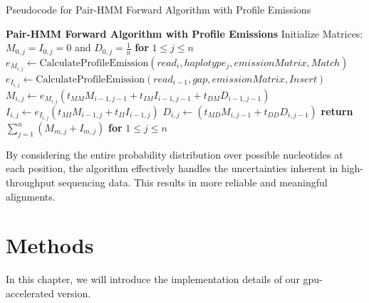 \documentclass[PhD]{PHlab-thesis}
\begin{document}
\vspace{0.5cm} %
\begin{algorithm}
\caption{Pseudocode for Pair-HMM Forward Algorithm with Profile Emissions}
\begin{algorithmic}[1]
\Procedure\textbf{Pair-HMM Forward Algorithm with Profile Emissions}
\State Initialize Matrices: $M_{0,j} = I_{0,j} = 0$ and $D_{0,j} = \frac{1}{n}$ \textbf{for} $1 \leq j \leq n$
        \State $e_{M_{i,j}} \gets \text{CalculateProfileEmission}(read_{i}, haplotype_{j}, emissionMatrix, Match)$
        \State $e_{I_{i,j}} \gets \text{CalculateProfileEmission}(read_{i-1}, gap, emissionMatrix, Insert)$
        \State $M_{i,j} \gets e_{M_{i,j}} (t_{MM} M_{i-1,j-1}  + t_{IM} I_{i-1,j-1}  +  t_{DM} D_{i-1,j-1})$
        \State $I_{i,j} \gets e_{I_{i,j}} (t_{MI} M_{i-1,j}  + t_{II} I_{i-1,j} )$
        \State $D_{i,j} \gets (t_{MD} M_{i,j-1} + t_{DD} D_{i,j-1} )$
    \EndFor
\EndFor
\State \textbf{return }$\sum_{j=1}^{n} (M_{m,j} + I_{m,j})$ \textbf{for} $1 \leq j \leq n$
\EndProcedure
\end{algorithmic}
\end{algorithm}
\vspace{0.5cm} %
\newline
By considering the entire probability distribution over possible nucleotides at each position, the algorithm effectively handles the uncertainties inherent in high-throughput sequencing data. This results in more reliable and meaningful alignments.

\chapter{Methods}
In this chapter, we will introduce the implementation details of our gpu-accelerated version.
\end{document}
